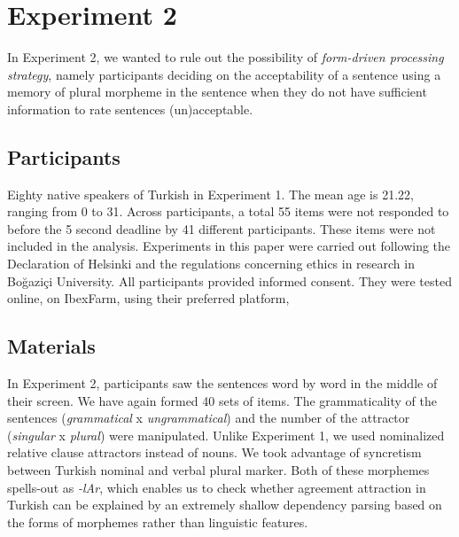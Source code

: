 \documentclass[doc,a4paper,man,natbib,floatsintext,noextraspace]{apa6}\usepackage[]{graphicx}\usepackage[]{color}
\begin{document}
\section{Experiment 2} \label{sec:exp2}







In Experiment 2, we wanted to rule out the possibility of \textit{form-driven processing strategy}, namely participants deciding on the acceptability of a sentence using a memory of plural morpheme in the sentence when they do not have sufficient information to rate sentences (un)acceptable. 
 

\subsection{Participants} \label{sec:exp2:participants}

Eighty native speakers of Turkish in Experiment 1. The mean age is 21.22, ranging from 0 to 31. Across participants, a total 55 items were not responded to before the 5 second deadline by 41 different participants. These items were not included in the analysis. Experiments in this paper were carried out following the Declaration of Helsinki and the regulations concerning ethics in research in Bo\u{g}azi\c{c}i University. All participants provided informed consent. They were tested online, on IbexFarm, using their preferred platform, %


\subsection{Materials} \label{sec:exp2:materials}

In Experiment 2, participants saw the sentences word by word in the middle of their screen. We have again formed 40 sets of items. The grammaticality of the sentences (\textit{grammatical} x \textit{ungrammatical}) and the number of the attractor (\textit{singular} x \textit{plural}) were manipulated. Unlike Experiment 1, we used nominalized relative clause attractors instead of nouns. We took advantage of syncretism between Turkish nominal and verbal plural marker. Both of these morphemes spells-out as \textit{-lAr}, which enables us to check whether agreement attraction in Turkish can be explained by an extremely shallow dependency parsing based on the forms of morphemes rather than linguistic features.
\end{document}
